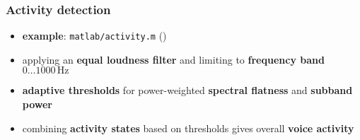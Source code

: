 \begin{frame} %
	\frametitle{Activity detection}
	\begin{itemize}
		\item \textbf{example}: \texttt{matlab/activity.m} ()
		\item applying an \textbf{equal loudness filter} and limiting to \textbf{frequency band} $0\ldots1000\,\textrm{Hz}$
			\begin{figure}
				\centering
				\begin{subfigure}[c]{0.40\linewidth}
				\end{subfigure}
				\hspace{0.01\linewidth}
				\begin{subfigure}[c]{0.40\linewidth}
				\end{subfigure}
			\end{figure}
		\item \textbf{adaptive thresholds} for power-weighted \textbf{spectral flatness} and \textbf{subband power}
			\begin{figure}
				\centering
				\begin{subfigure}[c]{0.40\linewidth}
				\end{subfigure}
				\hspace{0.01\linewidth}
				\begin{subfigure}[c]{0.40\linewidth}
				\end{subfigure}
			\end{figure}
		\item combining \textbf{activity states} based on thresholds gives overall \textbf{voice activity}
	\end{itemize}
\end{frame}

